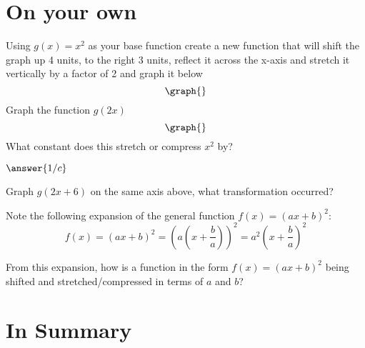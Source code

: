 \documentclass{ximera}
\begin{document}
\section{On your own}
\begin{question}
Using $g(x) = x^2$ as your base function create a new function that will shift the graph up 4 units, to the right 3 units, reflect it across the x-axis and stretch it vertically by a factor of 2 and graph it below
\[
\graph{}
\]
Graph the function $g(2x)$
\[
\graph{}
\]
What constant does this stretch or compress $x^2$ by?

$\answer{1/c}$

Graph $g(2x+6)$ on the same axis above, what transformation occurred?
\begin{freeResponse}
\end{freeResponse}
Note the following expansion of the general function $f(x)=(ax+b)^2$: $$\displaystyle f(x)=\left(ax+b\right)^2=\left(a\left(x+\frac{b}{a}\right)\right)^2=a^2\left(x+\frac{b}{a}\right)^2$$

From this expansion, how is a function in the form $f(x)=(ax+b)^2$ being shifted and stretched/compressed in terms of $a$ and $b$?
\begin{freeResponse}
\end{freeResponse}

\end{question}
\section{In Summary}
\end{document}
